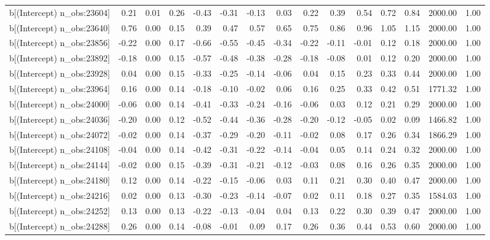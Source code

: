 \begin{table}[ht]
\begin{tabular}{rrrrrrrrrrrrrrr}
  b[(Intercept) n\_obs:23604] & 0.21 & 0.01 & 0.26 & -0.43 & -0.31 & -0.13 & 0.03 & 0.22 & 0.39 & 0.54 & 0.72 & 0.84 & 2000.00 & 1.00 \\ 
  b[(Intercept) n\_obs:23640] & 0.76 & 0.00 & 0.15 & 0.39 & 0.47 & 0.57 & 0.65 & 0.75 & 0.86 & 0.96 & 1.05 & 1.15 & 2000.00 & 1.00 \\ 
  b[(Intercept) n\_obs:23856] & -0.22 & 0.00 & 0.17 & -0.66 & -0.55 & -0.45 & -0.34 & -0.22 & -0.11 & -0.01 & 0.12 & 0.18 & 2000.00 & 1.00 \\ 
  b[(Intercept) n\_obs:23892] & -0.18 & 0.00 & 0.15 & -0.57 & -0.48 & -0.38 & -0.28 & -0.18 & -0.08 & 0.01 & 0.12 & 0.20 & 2000.00 & 1.00 \\ 
  b[(Intercept) n\_obs:23928] & 0.04 & 0.00 & 0.15 & -0.33 & -0.25 & -0.14 & -0.06 & 0.04 & 0.15 & 0.23 & 0.33 & 0.44 & 2000.00 & 1.00 \\ 
  b[(Intercept) n\_obs:23964] & 0.16 & 0.00 & 0.14 & -0.18 & -0.10 & -0.02 & 0.06 & 0.16 & 0.25 & 0.33 & 0.42 & 0.51 & 1771.32 & 1.00 \\ 
  b[(Intercept) n\_obs:24000] & -0.06 & 0.00 & 0.14 & -0.41 & -0.33 & -0.24 & -0.16 & -0.06 & 0.03 & 0.12 & 0.21 & 0.29 & 2000.00 & 1.00 \\ 
  b[(Intercept) n\_obs:24036] & -0.20 & 0.00 & 0.12 & -0.52 & -0.44 & -0.36 & -0.28 & -0.20 & -0.12 & -0.05 & 0.02 & 0.09 & 1466.82 & 1.00 \\ 
  b[(Intercept) n\_obs:24072] & -0.02 & 0.00 & 0.14 & -0.37 & -0.29 & -0.20 & -0.11 & -0.02 & 0.08 & 0.17 & 0.26 & 0.34 & 1866.29 & 1.00 \\ 
  b[(Intercept) n\_obs:24108] & -0.04 & 0.00 & 0.14 & -0.42 & -0.31 & -0.22 & -0.14 & -0.04 & 0.05 & 0.14 & 0.24 & 0.32 & 2000.00 & 1.00 \\ 
  b[(Intercept) n\_obs:24144] & -0.02 & 0.00 & 0.15 & -0.39 & -0.31 & -0.21 & -0.12 & -0.03 & 0.08 & 0.16 & 0.26 & 0.35 & 2000.00 & 1.00 \\ 
  b[(Intercept) n\_obs:24180] & 0.12 & 0.00 & 0.14 & -0.22 & -0.15 & -0.06 & 0.03 & 0.11 & 0.21 & 0.30 & 0.40 & 0.47 & 2000.00 & 1.00 \\ 
  b[(Intercept) n\_obs:24216] & 0.02 & 0.00 & 0.13 & -0.30 & -0.23 & -0.14 & -0.07 & 0.02 & 0.11 & 0.18 & 0.27 & 0.35 & 1584.03 & 1.00 \\ 
  b[(Intercept) n\_obs:24252] & 0.13 & 0.00 & 0.13 & -0.22 & -0.13 & -0.04 & 0.04 & 0.13 & 0.22 & 0.30 & 0.39 & 0.47 & 2000.00 & 1.00 \\ 
  b[(Intercept) n\_obs:24288] & 0.26 & 0.00 & 0.14 & -0.08 & -0.01 & 0.09 & 0.17 & 0.26 & 0.36 & 0.44 & 0.53 & 0.60 & 2000.00 & 1.00 \\ 

\end{tabular}
\end{table}
